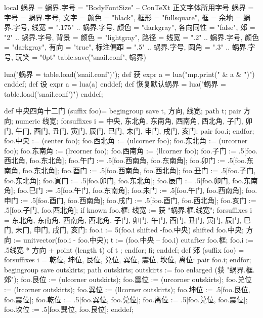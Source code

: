 \startluacode
local 蜗界 = {}
蜗界.字号 = "BodyFontSize" -- ConTeXt 正文字体所用字号
蜗界 = {
    字号 = 蜗界.字号,
    文字 = {颜色 = "black"},
    框形 = "fullsquare",
    框 = {余地 = 蜗界.字号,
          线宽 = ".175" .. 蜗界.字号,
          颜色 = "darkgray",
          各向同性 = "false",
          郊 = "2" .. 蜗界.字号},
    背景 = {颜色 = "lightgray"},
    路径 = {线宽 = ".2" .. 蜗界.字号,
            颜色 = "darkgray",
            有向 = "true",
            标注偏距 = ".5" .. 蜗界.字号,
            圆角 = ".3" .. 蜗界.字号},
    玩笑 = "0pt"
}
table.save("snail.conf", 蜗界)
\stopluacode

\startMPinclusions
lua("蜗界 = table.load('snail.conf')");
def 获 expr a = lua("mp.print(" & a & ")") enddef;
def 设 expr a = lua(a) enddef;
def 恢复默认蜗界 =
  lua("蜗界 = table.load('snail.conf')")
enddef;
\stopMPinclusions

\startMPinclusions[+]
def 中央四角十二门 (suffix foo)= 
  begingroup
  save t, 方向, 线宽; path t; pair 方向; numeric 线宽;
  forsuffixes i = 中央, 东北角, 东南角, 西南角, 西北角,
                  子门, 卯门, 午门, 酉门,
                  丑门, 寅门, 辰门, 巳门, 未门, 申门, 戌门, 亥门:
    pair foo.i;
  endfor;
  foo.中央 := (center foo);
  foo.西北角 := (ulcorner foo); 
  foo.东北角 := (urcorner foo);
  foo.东南角 := (lrcorner foo);
  foo.西南角 := (llcorner foo);
  foo.子门 := .5[foo.西北角, foo.东北角];
  foo.午门 := .5[foo.西南角, foo.东南角];
  foo.卯门 := .5[foo.东南角, foo.东北角];
  foo.酉门 := .5[foo.西南角, foo.西北角];
  foo.丑门 := .5[foo.子门, foo.东北角];
  foo.寅门 := .5[foo.卯门, foo.东北角];
  foo.辰门 := .5[foo.卯门, foo.东南角];
  foo.巳门 := .5[foo.午门, foo.东南角];
  foo.未门 := .5[foo.午门, foo.西南角];
  foo.申门 := .5[foo.酉门, foo.西南角];
  foo.戌门 := .5[foo.酉门, foo.西北角];
  foo.亥门 := .5[foo.子门, foo.西北角];
  if known foo.框:
    线宽 := 获 "蜗界.框.线宽";
    forsuffixes i = 东北角, 东南角, 西南角, 西北角,
                    子门, 卯门, 午门, 酉门,
                    丑门, 寅门, 辰门, 巳门, 未门, 申门, 戌门, 亥门:
      foo.i := 5(foo.i shifted -foo.中央) shifted foo.中央;
      方向 := unitvector(foo.i - foo.中央);
      t := (foo.中央 -- foo.i) cutafter foo.框;
      foo.i := .5线宽 * 方向 + point (length t) of t ;
    endfor;
  fi;
enddef;
def 郊 (suffix foo) = 
  forsuffixes i = 乾位, 坤位, 艮位, 兑位, 巽位, 震位, 坎位, 离位:
    pair foo.i;
  endfor;
  begingroup
    save outskirts; path outskirts;
  outskirts := foo enlarged (获 "蜗界.框.郊");
  foo.艮位 := (ulcorner outskirts); 
  foo.震位 := (urcorner outskirts);
  foo.兑位 := (lrcorner outskirts);
  foo.巽位 := (llcorner outskirts);
  foo.坤位 := .5[foo.艮位, foo.震位];
  foo.乾位 := .5[foo.巽位, foo.兑位];
  foo.离位 := .5[foo.兑位, foo.震位];
  foo.坎位 := .5[foo.巽位, foo.艮位];
enddef;

